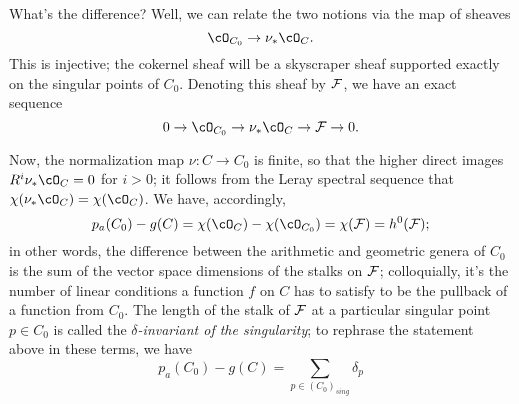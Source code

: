 What's the difference? Well, we can relate the two notions via the map of sheaves
$$
\cO_{C_0} \to \nu_*\cO_C.
$$
This is injective; the cokernel sheaf will be a skyscraper sheaf supported exactly on the singular points of $C_0$. Denoting this sheaf by $\cF$, we have an exact sequence
$$
0 \to \cO_{C_0} \to \nu_*\cO_C \to \cF \to 0.
$$

Now, the normalization map $\nu: C \to C_0$ is finite, so that the higher direct images $R^i\nu_*\cO_C = 0$ for $i > 0$; it follows from the Leray spectral sequence that $\chi(\nu_*\cO_C) = \chi(\cO_C)$. We have, accordingly,
$$
p_a(C_0) - g(C) =  \chi(\cO_{C}) -   \chi(\cO_{C_0}) = \chi(\cF) = h^0(\cF);
$$ 
in other words, the difference between the arithmetic and geometric genera of $C_0$ is the sum of the vector space dimensions of the stalks on $\cF$; colloquially, it's the number of linear conditions a function $f$ on $C$ has to satisfy to be the pullback of a function from $C_0$. The length of the stalk of $\cF$ at a particular singular point $p \in C_0$ is called the \emph{$\delta$-invariant of the singularity}; to rephrase the statement above in these terms, we have
$$
p_a(C_0) - g(C) = \sum_{p \in (C_0)_{sing}} \delta_p
$$ 

